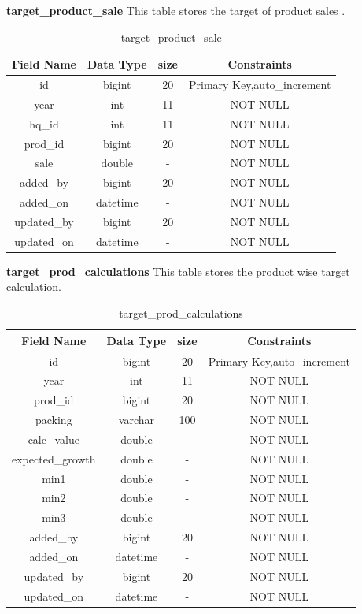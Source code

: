 \textbf{target\_product\_sale} This table stores the target of product sales .\nolinebreak
\begin{table}[hp]
\centering
\begin{tabular}{|c|c|c|c|}
\hline
\textbf{Field Name}  & \textbf{Data Type}  & \textbf{size} &\textbf{Constraints}  \\
\hline
id &	bigint &	20 & Primary Key,auto\_increment \\\hline
year &	 int &	11 & NOT NULL \\\hline
hq\_id	 & int &	11 & NOT NULL \\\hline
prod\_id &	bigint &	20 & NOT NULL \\\hline
sale &	double &	- & NOT NULL \\\hline
 added\_by &	bigint &	20 & NOT NULL \\\hline
added\_on &	datetime &	- & NOT NULL \\\hline
updated\_by &	bigint &	20 & NOT NULL \\\hline
updated\_on &	datetime &	- & NOT NULL \\\hline

 
\end{tabular}
\caption{target\_product\_sale}
\end{table}

\textbf{target\_prod\_calculations} This table stores the product wise  target calculation.\nolinebreak
\begin{table}[hp]
\centering
\begin{tabular}{|c|c|c|c|}
\hline
\textbf{Field Name}  & \textbf{Data Type}  & \textbf{size} &\textbf{Constraints}  \\
\hline
id &	bigint &	20 & Primary Key,auto\_increment \\\hline
year &	int &	11 & NOT NULL \\\hline
prod\_id &	bigint &	20 & NOT NULL \\\hline
packing &	varchar &	100 & NOT NULL \\\hline
calc\_value &	double &	- & NOT NULL \\\hline
expected\_growth &	double &	- & NOT NULL \\\hline
min1 &	double &	- & NOT NULL \\\hline
 min2 &	double &	- & NOT NULL \\\hline
  min3 &	double &	- & NOT NULL \\\hline
  added\_by &	bigint &	20 & NOT NULL \\\hline
added\_on &	datetime &	- & NOT NULL \\\hline
updated\_by &	bigint &	20 & NOT NULL \\\hline
updated\_on	 & datetime &	- & NOT NULL \\\hline

 
\end{tabular}
\caption{target\_prod\_calculations}
\end{table}

